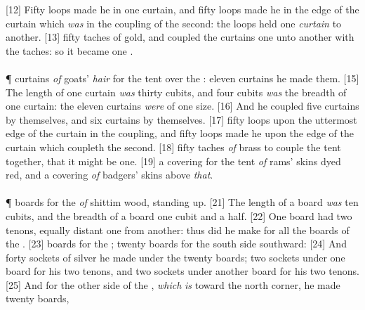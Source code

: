 [12] \textcolor[cmyk]{0.99998,1,0,0}{Fifty loops made he in one curtain, and fifty loops made he in the edge of the curtain which \emph{was} in the coupling of the second: the loops held one \emph{curtain} to another.}
[13] \textcolor[cmyk]{0.99998,1,0,0}{ fifty taches of gold, and coupled the curtains one unto another with the taches: so it became one .}\\
\\
\P \textcolor[cmyk]{0.99998,1,0,0}{ curtains \emph{of} goats' \emph{hair} for the tent over the : eleven curtains he made them.}
[15] \textcolor[cmyk]{0.99998,1,0,0}{The length of one curtain \emph{was} thirty cubits, and four cubits \emph{was} the breadth of one curtain: the eleven curtains \emph{were} of one size.}
[16] \textcolor[cmyk]{0.99998,1,0,0}{And he coupled five curtains by themselves, and six curtains by themselves.}
[17] \textcolor[cmyk]{0.99998,1,0,0}{ fifty loops upon the uttermost edge of the curtain in the coupling, and fifty loops made he upon the edge of the curtain which coupleth the second.}
[18] \textcolor[cmyk]{0.99998,1,0,0}{ fifty taches \emph{of} brass to couple the tent together, that it might be one.}
[19] \textcolor[cmyk]{0.99998,1,0,0}{ a covering for the tent \emph{of} rams' skins dyed red, and a covering \emph{of} badgers' skins above \emph{that}.}\\
\\
\P \textcolor[cmyk]{0.99998,1,0,0}{ boards for the  \emph{of} shittim wood, standing up.}
[21] \textcolor[cmyk]{0.99998,1,0,0}{The length of a board \emph{was} ten cubits, and the breadth of a board one cubit and a half.}
[22] \textcolor[cmyk]{0.99998,1,0,0}{One board had two tenons, equally distant one from another: thus did he make for all the boards of the .}
[23] \textcolor[cmyk]{0.99998,1,0,0}{ boards for the ; twenty boards for the south side southward:}
[24] \textcolor[cmyk]{0.99998,1,0,0}{And forty sockets of silver he made under the twenty boards; two sockets under one board for his two tenons, and two sockets under another board for his two tenons.}
[25] \textcolor[cmyk]{0.99998,1,0,0}{And for the other side of the , \emph{which} \emph{is} toward the north corner, he made twenty boards,}
